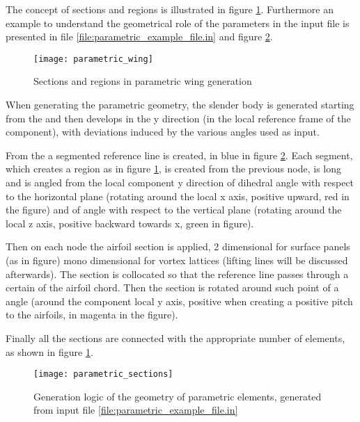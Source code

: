 
The concept of sections and regions is illustrated in figure \ref{fig:parametric_wing}. 
Furthermore an example to understand the geometrical role of the parameters in the input file is presented 
in file \ref{file:parametric_example_file.in} and figure \ref{fig:parametric_sections}.

\begin{figure}[h]
\centering
\texttt{[image: parametric\_wing]}
\caption{Sections and regions in parametric wing generation}
\label{fig:parametric_wing}
\end{figure}

When generating the parametric geometry, the slender body is generated starting from the  
and then develops in the y direction (in the local reference frame of the component), 
with deviations induced by the various angles used as input. 

From the  a segmented reference line is created, in blue in figure \ref{fig:parametric_sections}. 
Each segment, which creates a region as in figure \ref{fig:parametric_wing}, is created from the previous node, 
is long  and is angled from the local component y direction of  dihedral angle with respect 
to the horizontal plane (rotating around the local x axis, positive upward, red in the figure) and of  
angle with respect to the vertical plane (rotating around the local z axis, positive backward towards x, green in figure). 

Then on each node the airfoil section is applied, 2 dimensional for surface panels (as in figure) mono dimensional for 
vortex lattices (lifting lines will be discussed afterwards). 
The section is collocated so that the reference line passes through a certain  
of the airfoil chord. Then the section is rotated around such point of a  angle 
(around the component local y axis, positive when creating a positive pitch to the airfoils, in magenta in the figure). 

Finally all the sections are connected with the appropriate number of elements, as shown in figure \ref{fig:parametric_wing}.

\begin{figure}[h]
\centering
\texttt{[image: parametric\_sections]}
\caption{Generation logic of the geometry of parametric elements, generated from input file \ref{file:parametric_example_file.in}}
\label{fig:parametric_sections}
\end{figure}

